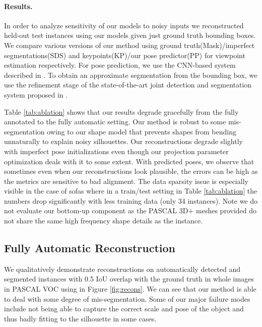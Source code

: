 \paragraph{Results.}
In order to analyze sensitivity of our models to noisy inputs we reconstructed held-out test instances using our models given just ground truth bounding boxes. We compare various versions of our method using ground truth(Mask)/imperfect segmentations(SDS) and keypoints(KP)/our pose predictor(PP) for viewpoint estimation respectively. For pose prediction, we use the CNN-based system described in . To obtain an approximate segmentation from the bounding box, we use the refinement stage of the state-of-the-art joint detection and segmentation system proposed in \cite{BharathECCV2014}. 

Table \ref{tab:ablation} shows that our results degrade gracefully from the fully annotated to the fully automatic setting. Our method is robust to some mis-segmentation owing to our shape model that prevents shapes from bending unnaturally to explain noisy silhouettes. Our reconstructions degrade slightly with imperfect pose initializations even though our projection parameter optimization deals with it to some extent. With predicted poses, we observe that sometimes even when our reconstructions look plausible, the errors can be high as the metrics are sensitive to bad alignment. The data sparsity issue is especially visible in the case of sofas where in a train/test setting in Table \ref{tab:ablation} the numbers drop significantly with less training data (only 34 instances). Note we do not evaluate our bottom-up component as the PASCAL 3D+ meshes provided do not share the same high frequency shape details as the instance.

\subsection{Fully Automatic Reconstruction}
We qualitatively demonstrate reconstructions on automatically detected and segmented instances with 0.5 IoU overlap with the ground truth in whole images in PASCAL VOC using \cite{BharathECCV2014} in Figure \ref{fig:recons}. We can see that our method is able to deal with some degree of mis-segmentation. Some of our major failure modes include not being able to capture the correct scale and pose of the object and thus badly fitting to the silhouette in some cases.

